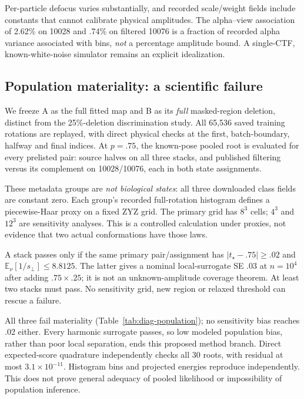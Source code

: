 \documentclass{article}
\newcommand{\E}{\mathbb E}
\begin{document}
Per-particle defocus varies substantially, and recorded scale/weight fields
include constants that cannot calibrate physical amplitudes. The alpha--view
association of 2.62\% on 10028 and .74\% on filtered 10076 is a fraction of
recorded alpha variance associated with bins, \emph{not} a percentage
amplitude bound. A single-CTF, known-white-noise simulator remains an
explicit idealization.

\subsection{Population materiality: a scientific failure}
We freeze A as the full fitted map and B as its \emph{full} masked-region
deletion, distinct from the 25\%-deletion discrimination study. All 65,536
saved training rotations are replayed, with direct physical checks at the
first, batch-boundary, halfway and final indices. At $p=.75$, the
known-pose pooled root is evaluated for every prelisted pair: source halves
on all three stacks, and published filtering versus its complement on
10028/10076, each in both state assignments.

These metadata groups are \emph{not biological states}: all three downloaded
class fields are constant zero. Each group's recorded full-rotation
histogram defines a piecewise-Haar proxy on a fixed ZYZ grid. The primary
grid has $8^3$ cells; $4^3$ and $12^3$ are sensitivity analyses. This is
a controlled calculation under proxies, not evidence that two actual
conformations have those laws.

A stack passes only if the same primary pair/assignment has
$|t_\star-.75|\ge .02$ and
$\E_\nu[1/s_\perp]\le8.8125$. The latter gives a nominal local-surrogate
SE .03 at $n=10^4$ after adding $.75\times.25$; it is not an unknown-amplitude
coverage theorem. At least two stacks must pass. No sensitivity grid,
new region or relaxed threshold can rescue a failure.

All three fail materiality (Table~\ref{tab:diag-population}); no sensitivity
bias reaches .02 either. Every harmonic surrogate passes, so low modeled
population bias, rather than poor local separation, ends this proposed
method branch. Direct expected-score quadrature independently checks all
30 roots, with residual at most $3.1\times10^{-11}$. Histogram bins and
projected energies reproduce independently. This does not prove general
adequacy of pooled likelihood or impossibility of population inference.
\end{document}
